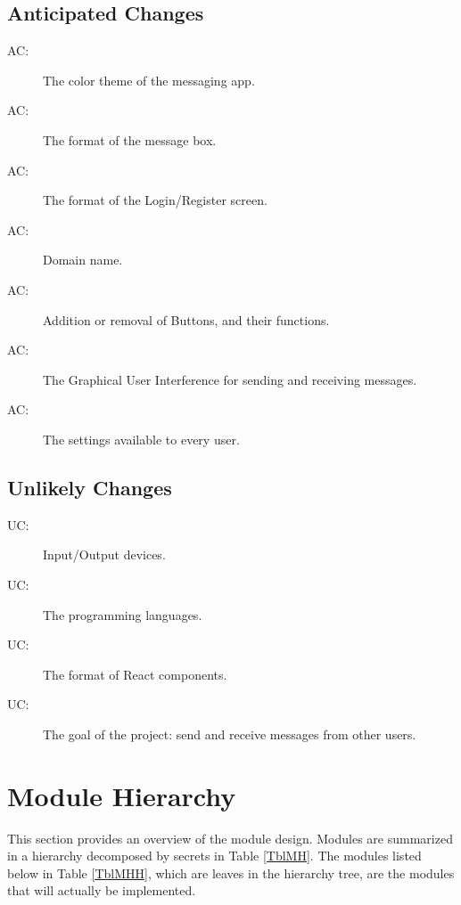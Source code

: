 \documentclass[12pt, titlepage]{article}
\newcounter{acnum}
\newcommand{\actheacnum}{AC\theacnum}
\newcounter{ucnum}
\newcommand{\uctheucnum}{UC\theucnum}
\begin{document}
\subsection{Anticipated Changes} \label{SecAchange}
\begin{description}
\item[ \actheacnum \label{acColor}:] The color theme of the messaging app.
\item[ \actheacnum \label{acMessage}:] The format of the message box.
\item[ \actheacnum \label{acLogin}:] The format of the Login/Register screen.
\item[ \actheacnum \label{acDomain}:] Domain name.
\item[ \actheacnum \label{acButtons}:] Addition or removal of Buttons, and their functions.
\item[ \actheacnum \label{acGUI}:] The Graphical User Interference for sending and receiving messages.
\item[ \actheacnum \label{acSettings}:] The settings available to every user.
\end{description}

\subsection{Unlikely Changes} \label{SecUchange}
\begin{description}
\item[ \uctheucnum \label{ucIO}:] Input/Output devices.
\item[ \uctheucnum \label{ucIO}:] The programming languages.
\item[ \uctheucnum \label{ucIO}:] The format of React components.
\item[ \uctheucnum \label{ucIO}:] The goal of the project: send and receive messages from other users.
\end{description}

\section{Module Hierarchy} \label{SecMH}

This section provides an overview of the module design. Modules are summarized
in a hierarchy decomposed by secrets in Table \ref{TblMH}. The  modules listed
below in Table \ref{TblMHH}, which are leaves in the hierarchy tree, are the modules that will
actually be implemented.
\end{document}
